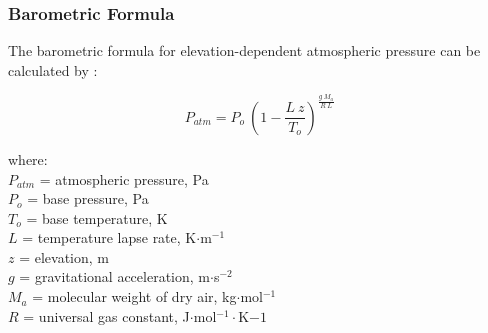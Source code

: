\subsubsection{Barometric Formula}
\label{sec:atm}
The barometric formula for elevation-dependent atmospheric pressure can be calculated by \parencite{allen98}:

\begin{equation}
\label{eq:atm}
	P_{atm} = P_o \: \left(1 - \frac{L \: z}{T_o}\right)^{\frac{g\: M_a}{R\: L}}
\end{equation}

\noindent where: \\
\indent $P_{atm}$ = atmospheric pressure, Pa \\
\indent $P_o$ = base pressure, Pa \\
\indent $T_o$ = base temperature, K \\
\indent $L$ = temperature lapse rate, K$\cdot$m$^{-1}$ \\
\indent $z$ = elevation, m \\
\indent $g$ = gravitational acceleration, m$\cdot$s$^{-2}$ \\
\indent $M_a$ = molecular weight of dry air, kg$\cdot$mol$^{-1}$ \\
\indent $R$ = universal gas constant, J$\cdot$mol$^{-1}\cdot$K${-1}$ \\

